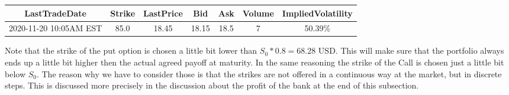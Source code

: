 \documentclass[11pt,oneside,a4paper]{article}
\begin{document}
	\begin{tabular}{|c|c|c|c|c|c|c|}
		\hline\textbf{{LastTradeDate}} & \textbf{Strike} & \textbf{LastPrice} & \textbf{Bid} & \textbf{Ask} & \textbf{Volume} & \textbf{ImpliedVolatility}\\\hline
		2020-11-20 10:05AM EST & 85.0 & 18.45 & 18.15 & 18.5 & 7 & 50.39\%
		\\\hline
	\end{tabular}
	
	Note that the strike of the put option is chosen a little bit lower than $ S_0*0.8 = 68.28 \text{ USD} $. This will make sure that the portfolio always ends up a little bit higher then the actual agreed payoff at maturity. In the same reasoning the strike of the Call is chosen just a little bit below $ S_0 $. The reason why we have to consider those is that the strikes are not offered in a continuous way at the market, but in discrete steps. This is discussed more precisely in the discussion about the profit of the bank at the end of this subsection.
	
\end{document}
